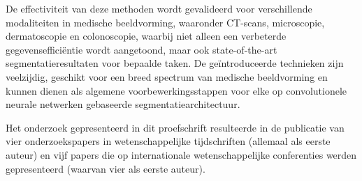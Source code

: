 De effectiviteit van deze methoden wordt gevalideerd voor verschillende modaliteiten in medische beeldvorming, waaronder CT-scans, microscopie, dermatoscopie en colonoscopie, waarbij niet alleen een verbeterde gegevensefficiëntie wordt aangetoond, maar ook state-of-the-art segmentatieresultaten voor bepaalde taken. De geïntroduceerde technieken zijn veelzijdig, geschikt voor een breed spectrum van medische beeldvorming en kunnen dienen als algemene voorbewerkingsstappen voor elke op convolutionele neurale netwerken gebaseerde segmentatiearchitectuur.

Het onderzoek gepresenteerd in dit proefschrift resulteerde in de publicatie van vier onderzoekspapers in wetenschappelijke tijdschriften (allemaal als eerste auteur) en vijf papers die op internationale wetenschappelijke conferenties werden gepresenteerd (waarvan vier als eerste auteur). 